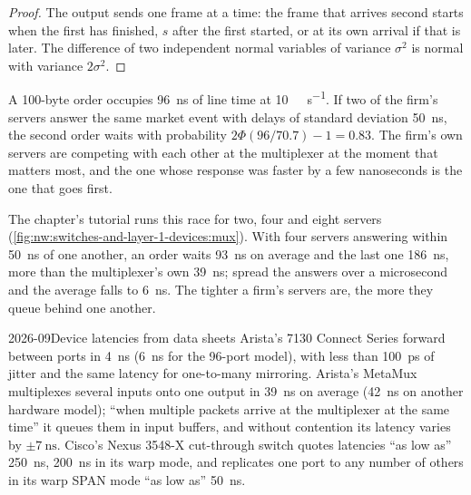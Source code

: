 \begin{proof}
The output sends one frame at a time: the frame that arrives second starts when the first has finished, $s$ after the first
started, or at its own arrival if that is later. The difference of two independent normal variables of variance $\sigma^2$ is
normal with variance $2\sigma^2$.
\end{proof}

\begin{example}\label{ex:nw:switches-and-layer-1-devices:two}
A 100-byte order occupies \qty{96}{\nano\second} of line time at \qty{10}{\giga\bit\per\second}. If two of the firm's servers
answer the same market event with delays of standard deviation \qty{50}{\nano\second}, the second order waits with probability
$2\Phi(96/70.7) - 1 = 0.83$. The firm's own servers are competing with each other at the multiplexer at the moment that matters
most, and the one whose response was faster by a few nanoseconds is the one that goes first.
\end{example}

The chapter's tutorial runs this race for two, four and eight servers (\cref{fig:nw:switches-and-layer-1-devices:mux}). With four
servers answering within \qty{50}{\nano\second} of one another, an order waits \qty{93}{\nano\second} on average and the last one
\qty{186}{\nano\second}, more than the multiplexer's own \qty{39}{\nano\second}; spread the answers over a microsecond and the average
falls to \qty{6}{\nano\second}. The tighter a firm's servers are, the more they queue behind one another.

\begin{dated}{2026-09}{Device latencies from data sheets}\label{dat:nw:switches-and-layer-1-devices:devices}
Arista's 7130 Connect Series  forward between ports in \qty{4}{\nano\second} (\qty{6}{\nano\second} for the
96-port model), with less than \qty{100}{\pico\second} of jitter and the same latency for one-to-many mirroring. Arista's MetaMux
multiplexes several inputs onto one output in \qty{39}{\nano\second} on average (\qty{42}{\nano\second} on another hardware
model); ``when multiple packets arrive at the multiplexer at the same time'' it queues them in input buffers, and without
contention its latency varies by $\pm\qty{7}{\nano\second}$. Cisco's Nexus 3548-X cut-through switch quotes latencies ``as low as''
\qty{250}{\nano\second}, \qty{200}{\nano\second} in its warp mode, and replicates one port to any number of others in its warp SPAN
mode ``as low as'' \qty{50}{\nano\second}.
\end{dated}

